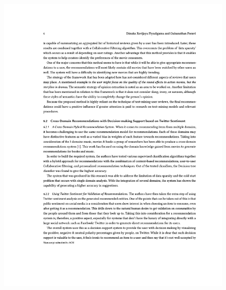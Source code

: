 \begin{figure}[h!]
\centering
\includegraphics[width=\textwidth]{images/appendix/papers/review/A Review on Pushing the Limits of Baseline Recommendation Systems with the integration of Opinion Mining & Information Retrieval Techniques 4.jpeg}
\end{figure}

